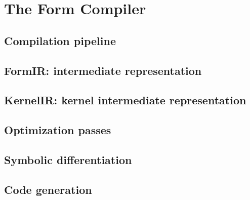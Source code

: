 \chapter{The Form Compiler}
\label{ch:compiler}

\section{Compilation pipeline}
\label{sec:compiler:pipeline}


\section{FormIR: intermediate representation}
\label{sec:compiler:formir}


\section{KernelIR: kernel intermediate representation}
\label{sec:compiler:kernelir}


\section{Optimization passes}
\label{sec:compiler:optimization}


\section{Symbolic differentiation}
\label{sec:compiler:differentiation}


\section{Code generation}
\label{sec:compiler:codegen}

